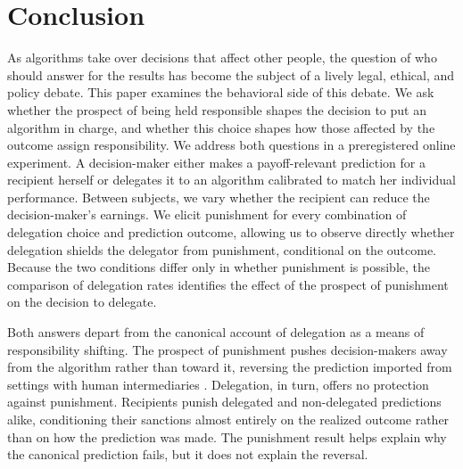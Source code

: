 \section{Conclusion} \label{conclusion}

As algorithms take over decisions that affect other people, the question of who should answer for the results has become the subject of a lively legal, ethical, and policy debate. This paper examines the behavioral side of this debate. We ask whether the prospect of being held responsible shapes the decision to put an algorithm in charge, and whether this choice shapes how those affected by the outcome assign responsibility. We address both questions in a preregistered online experiment. A decision-maker either makes a payoff-relevant prediction for a recipient herself or delegates it to an algorithm calibrated to match her individual performance. Between subjects, we vary whether the recipient can reduce the decision-maker's earnings. We elicit punishment for every combination of delegation choice and prediction outcome, allowing us to observe directly whether delegation shields the delegator from punishment, conditional on the outcome. Because the two conditions differ only in whether punishment is possible, the comparison of delegation rates identifies the effect of the prospect of punishment on the decision to delegate.

Both answers depart from the canonical account of delegation as a means of responsibility shifting. The prospect of punishment pushes decision-makers away from the algorithm rather than toward it, reversing the prediction imported from settings with human intermediaries \citep[e.g.,][]{bartling_shifting_2012}. Delegation, in turn, offers no protection against punishment. Recipients punish delegated and non-delegated predictions alike, conditioning their sanctions almost entirely on the realized outcome rather than on how the prediction was made. The punishment result helps explain why the canonical prediction fails, but it does not explain the reversal.

